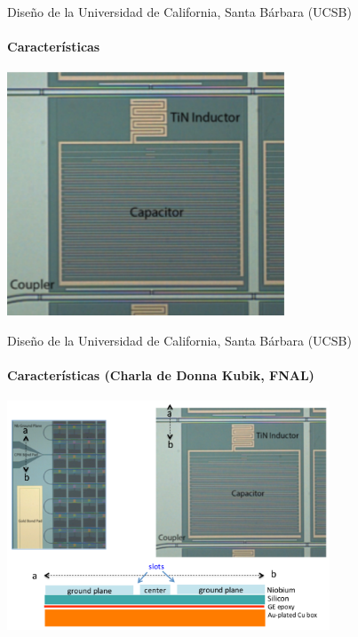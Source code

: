 \documentclass[ignorenonframetext,12pt]{beamer}
\begin{document}
\begin{frame}{Diseño de la Universidad de California, Santa Bárbara (UCSB)}
				\framesubtitle{Características}
				\centering
												\includegraphics[width=0.62\textwidth]{mkid_ucsb1}
\end{frame}
\begin{frame}{Diseño de la Universidad de California, Santa Bárbara (UCSB)}
				\framesubtitle{Características (Charla de Donna Kubik, FNAL)}
				
				\centering
												\includegraphics[width=0.72\textwidth]{mkid_ucsb2}
\end{frame}
\end{document}
